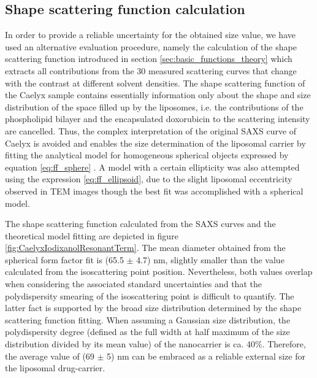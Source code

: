 \subsection{Shape scattering function calculation}
In order to provide a reliable uncertainty for the obtained size value, we have used an alternative evaluation procedure, namely the calculation of the shape scattering function introduced in section \ref{sec:basic_functions_theory} which extracts all contributions from the 30 measured scattering curves that change with the contrast at different solvent densities. The shape scattering function of the Caelyx sample contains essentially information only about the shape and size distribution of the space filled up by the liposomes, i.e. the contributions of the phospholipid bilayer and the encapsulated doxorubicin to the scattering intensity are cancelled. Thus, the complex interpretation of the original SAXS curve of Caelyx is avoided and enables the size determination of the liposomal carrier by fitting the analytical model for homogeneous spherical objects expressed by equation \ref{eq:ff_sphere} . A model with a certain ellipticity was also attempted using the expression \ref{eq:ff_ellipsoid}, due to the slight liposomal eccentricity observed in TEM images \citep{barenholz_doxil-first_2012} though the best fit was accomplished with a spherical model. 

%		

The shape scattering function calculated from the SAXS curves and the theoretical model fitting are depicted in figure \ref{fig:CaelyxIodixanolResonantTerm}. The mean diameter obtained from the spherical form factor fit is (65.5 $\pm$ 4.7) nm, slightly smaller than the value calculated from the isoscattering point position. Nevertheless, both values overlap when considering the associated standard uncertainties and that the polydispersity smearing of the isoscattering point is difficult to quantify. The latter fact is supported by the broad size distribution determined by the shape scattering function fitting. When assuming a Gaussian size distribution, the polydispersity degree (defined as the full width at half maximum of the size distribution divided by its mean value) of the nanocarrier is ca. 40$\%$. Therefore, the average value of (69 $\pm$ 5) nm can be embraced as a reliable external size for the liposomal drug-carrier.

